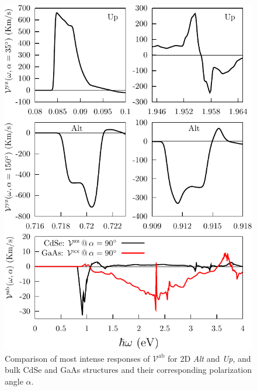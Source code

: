 \documentclass[prb,11pt,tightenlines,twocolumn,aps]{revtex4-1}
\begin{document}
\begin{figure}[t]
    \centering
    \includegraphics[width=\linewidth]{plots/2-vab-str-comp}
    
    \caption{Comparison of most intense responses of
    $\mathcal{V}^{\mathrm{ab}}$ for 2D \emph{Alt} and \emph{Up}, and bulk CdSe
    and GaAs structures and their corresponding polarization angle $\alpha$.}
    \label{fig:vab-str-comp}
\end{figure}
\end{document}
